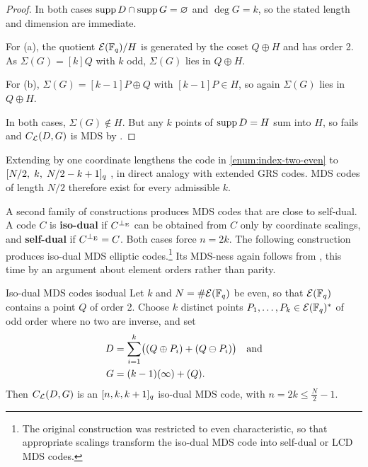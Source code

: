 \documentclass[twocolumn, 11pt]{scrartcl}
\begin{document}
\begin{proof}
In both cases $\supp D\cap\supp G=\emptyset$ and $\deg G=k$, so the stated length and dimension are immediate.

For (a), the quotient $\mcE(\bbF_q)/H$ is generated by the coset $Q\oplus H$ and has order 2. As $\Sigma(G)=[k]Q$ with $k$ odd, $\Sigma(G)$ lies in $Q\oplus H$.

For (b), $\Sigma(G)=[k-1]P\oplus Q$ with $[k-1]P\in H$, so again $\Sigma(G)$ lies in $Q\oplus H$.

In both cases, $\Sigma(G)\notin H$. But any $k$ points of $\supp D=H$ sum into $H$, so  fails and $C_\mcL(D,G)$ is MDS by .
\end{proof}

Extending by one coordinate lengthens the code in \ref{enum:index-two-even} to $\br{N/2,\;k,\;N/2-k+1}_q$ \cite{mh4310ld7}, in direct analogy with extended GRS codes. MDS codes of length $N/2$ therefore exist for every admissible $k$.

A second family of constructions produces MDS codes that are close to self-dual. A code $C$ is \textbf{iso-dual} if $C^{\perp_\rmE}$ can be obtained from $C$ only by coordinate scalings, and \textbf{self-dual} if $C^{\perp_\rmE}=C$. Both cases force $n=2k$. The following construction produces iso-dual MDS elliptic codes.\footnote{The original construction \cite[Construction~1]{zhu2026isodual} was restricted to even characteristic, so that appropriate scalings transform the iso-dual MDS code into self-dual or LCD MDS codes.} Its MDS-ness again follows from , this time by an argument about element orders rather than parity.

\begin{construction}{Iso-dual MDS codes \cite{zhu2026isodual}}{isodual}
    Let $k$ and $N=\#\mcE(\bbF_q)$ be even, so that $\mcE(\bbF_q)$ contains a point $Q$ of order 2. Choose $k$ distinct points $P_1,\hdots,P_k\in\mcE(\bbF_q)^*$ of odd order where no two are inverse, and set
    \begin{align*}
        D&=\sum_{i=1}^{k}\pa[\big]{(Q\oplus P_i)+(Q\ominus P_i)}\quad\text{and} \\
        G&=(k-1)(\infty)+(Q).
    \end{align*}
    Then $C_\mcL(D,G)$ is an $\br{n,k,k+1}_q$ iso-dual MDS code, with $n=2k\leq \frac N2-1$.
\end{construction}
\end{document}
